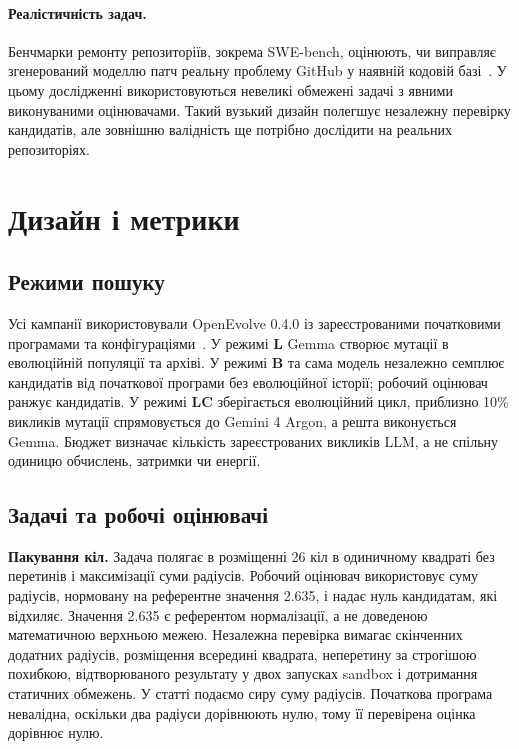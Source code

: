 \documentclass[11pt]{article}
\begin{document}
\paragraph{Реалістичність задач.} Бенчмарки ремонту репозиторіїв, зокрема SWE-bench, оцінюють, чи виправляє згенерований моделлю патч реальну проблему GitHub у наявній кодовій базі~\citep{jimenez2024swebench}. У цьому дослідженні використовуються невеликі обмежені задачі з явними виконуваними оцінювачами. Такий вузький дизайн полегшує незалежну перевірку кандидатів, але зовнішню валідність ще потрібно дослідити на реальних репозиторіях.

\section{Дизайн і метрики}\label{sec:design}

\subsection{Режими пошуку}

Усі кампанії використовували OpenEvolve 0.4.0 із зареєстрованими початковими програмами та конфігураціями~\citep{sharma2026openevolve}. У режимі \textbf{L} Gemma створює мутації в еволюційній популяції та архіві. У режимі \textbf{B} та сама модель незалежно семплює кандидатів від початкової програми без еволюційної історії; робочий оцінювач ранжує кандидатів. У режимі \textbf{LC} зберігається еволюційний цикл, приблизно 10\% викликів мутації спрямовується до Gemini 4 Argon, а решта виконується Gemma. Бюджет визначає кількість зареєстрованих викликів LLM, а не спільну одиницю обчислень, затримки чи енергії.

\subsection{Задачі та робочі оцінювачі}

\textbf{Пакування кіл.} Задача полягає в розміщенні 26 кіл в одиничному квадраті без перетинів і максимізації суми радіусів. Робочий оцінювач використовує суму радіусів, нормовану на референтне значення 2.635, і надає нуль кандидатам, які відхиляє. Значення 2.635 є референтом нормалізації, а не доведеною математичною верхньою межею. Незалежна перевірка вимагає скінченних додатних радіусів, розміщення всередині квадрата, неперетину за строгішою похибкою, відтворюваного результату у двох запусках sandbox і дотримання статичних обмежень. У статті подаємо сиру суму радіусів. Початкова програма невалідна, оскільки два радіуси дорівнюють нулю, тому її перевірена оцінка дорівнює нулю.
\end{document}
